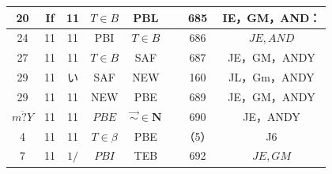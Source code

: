 \documentclass[10pt]{article}
\begin{document}
\begin{center}
\begin{tabular}{|c|c|c|c|c|c|c|c|}
 \\
\hline
20 & If & 11 & \(T \in B\) & PBL &  & 685 & IE，GM，AND： \\
\hline
24 & 11 & 11 & PBI & \(T \in B\) &  & 686 & \(J E, A N D\) \\
\hline
27 & 11 & 11 & \(T \in B\) & SAF &  & 687 & JE，GM，ANDY \\
\hline
29 & 11 & い & SAF & NEW &  & 160 & JL，Gm，ANDY \\
\hline
29 & 11 & 11 & NEW & PBE &  & 689 & JE，GM，ANDY \\
\hline
\( \overline{m ? Y} \) & 11 & 11 & \(P B E\) & \(\vec{\sim} \in \boldsymbol{N}\) &  & 690 & JE，ANDY \\
\hline
4 & 11 & 11 & \(T \in \beta\) & PBE &  & （5） & J6 \\
\hline
7 & 11 & \(1 /\) & \(P B I\) & TEB &  & 692 & \(J E, G M\) \\
\hline
\end{tabular}
\end{center}
\end{document}
